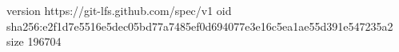 version https://git-lfs.github.com/spec/v1
oid sha256:e2f1d7e5516e5dec05bd77a7485ef0d694077e3e16c5ea1ae55d391e547235a2
size 196704
